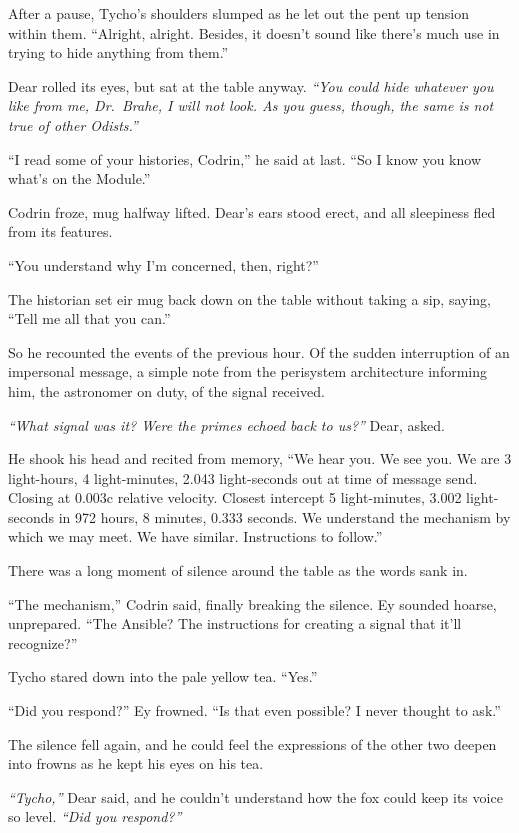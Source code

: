 After a pause, Tycho's shoulders slumped as he let out the pent up tension within them. ``Alright, alright. Besides, it doesn't sound like there's much use in trying to hide anything from them.''

Dear rolled its eyes, but sat at the table anyway. \emph{``You could hide whatever you like from me, Dr.~Brahe, I will not look. As you guess, though, the same is not true of other Odists.''}

``I read some of your histories, Codrin,'' he said at last. ``So I know you know what's on the Module.''

Codrin froze, mug halfway lifted. Dear's ears stood erect, and all sleepiness fled from its features.

``You understand why I'm concerned, then, right?''

The historian set eir mug back down on the table without taking a sip, saying, ``Tell me all that you can.''

So he recounted the events of the previous hour. Of the sudden interruption of an impersonal message, a simple note from the perisystem architecture informing him, the astronomer on duty, of the signal received.

\emph{``What signal was it? Were the primes echoed back to us?''} Dear, asked.

He shook his head and recited from memory, ``We hear you. We see you. We are 3 light-hours, 4 light-minutes, 2.043 light-seconds out at time of message send. Closing at 0.003c relative velocity. Closest intercept 5 light-minutes, 3.002 light-seconds in 972 hours, 8 minutes, 0.333 seconds. We understand the mechanism by which we may meet. We have similar. Instructions to follow.''

There was a long moment of silence around the table as the words sank in.

``The mechanism,'' Codrin said, finally breaking the silence. Ey sounded hoarse, unprepared. ``The Ansible? The instructions for creating a signal that it'll recognize?''

Tycho stared down into the pale yellow tea. ``Yes.''

``Did you respond?'' Ey frowned. ``Is that even possible? I never thought to ask.''

The silence fell again, and he could feel the expressions of the other two deepen into frowns as he kept his eyes on his tea.

\emph{``Tycho,''} Dear said, and he couldn't understand how the fox could keep its voice so level. \emph{``Did you respond?''}

